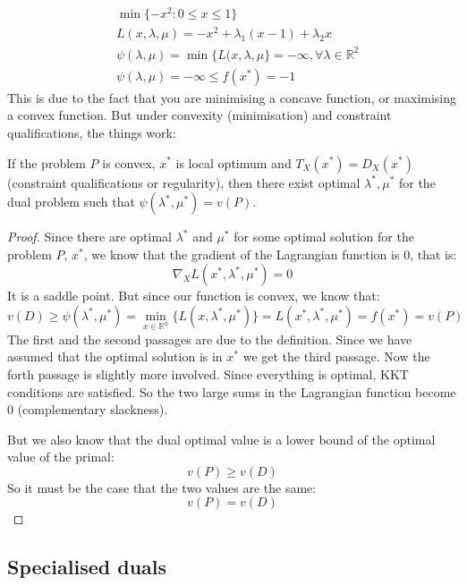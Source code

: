 \begin{align}
    &\min\{-x^2 : 0 \leq x \leq 1\}\\
    &L(x,\lambda,\mu) = -x^2 + \lambda_1 (x-1) + \lambda_2 x\\
    &\psi(\lambda,\mu) = \min \{L(x,\lambda,\mu\} = -\infty, \forall \lambda \in \mathbb{R}^2\\
    &\psi(\lambda,\mu) = -\infty \leq f(x^*) = -1
\end{align}
This is due to the fact that you are minimising a concave function, or maximising a convex function. But under convexity (minimisation) and constraint qualifications, the things work:
\begin{theorem}
    If the problem $P$ is convex, $x^*$ is local optimum and $T_X(x^*) = D_X(x^*)$ (constraint qualifications or regularity), then there exist optimal $\lambda^*, \mu^*$ for the dual problem such that $\psi(\lambda^*, \mu^*) = v(P)$.
\end{theorem}
\begin{proof}
    Since there are optimal $\lambda^*$ and $\mu^*$ for some optimal solution for the problem $P$, $x^*$, we know that the gradient of the Lagrangian function is 0, that is:
    \[
        \nabla_X L(x^*,\lambda^*,\mu^*) = 0
    \]
    It is a saddle point. But since our function is convex, we know that:
    \[
        v(D) \geq \psi(\lambda^*,\mu^*) = \min_{x \in \mathbb{R}^n}\{L(x,\lambda^*,\mu^*)\} = L(x^*,\lambda^*,\mu^*) = f(x^*) = v(P)
    \]
    The first and the second passages are due to the definition. Since we have assumed that the optimal solution is in $x^*$ we get the third passage. Now the forth passage is slightly more involved. Since everything is optimal, KKT conditions are satisfied. So the two large sums in the Lagrangian function become 0 (complementary slackness).
    \par But we also know that the dual optimal value is a lower bound of the optimal value of the primal:
    \[
        v(P) \geq v(D)
    \]
    So it must be the case that the two values are the same:
    \[
        v(P) = v(D)
    \]
\end{proof}
%
\subsection{Specialised duals}
